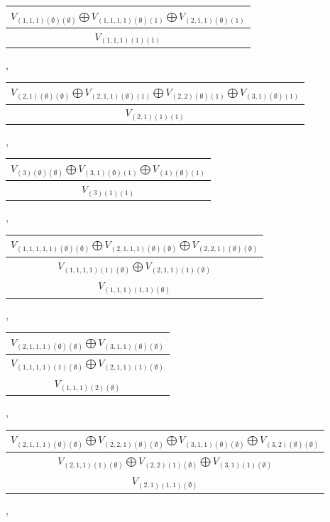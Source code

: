 \documentclass[letterpaper,11pt]{article}
\begin{document}
	\begin{tabular}{| c |}
		\hline
		$V_{(1,1,1)(\emptyset)(\emptyset)}$$\bigoplus$$V_{(1,1,1,1)(\emptyset)(1)}$$\bigoplus$$V_{(2,1,1)(\emptyset)(1)}$\\
		\hline
		$V_{(1,1,1)(1)(1)}$\\
		\hline
	\end{tabular}, 
	\newline 
	\begin{tabular}{| c |}
		\hline
		$V_{(2,1)(\emptyset)(\emptyset)}$$\bigoplus$$V_{(2,1,1)(\emptyset)(1)}$$\bigoplus$$V_{(2,2)(\emptyset)(1)}$$\bigoplus$$V_{(3,1)(\emptyset)(1)}$\\
		\hline
		$V_{(2,1)(1)(1)}$\\
		\hline
	\end{tabular},
	\begin{tabular}{| c |}
		\hline
		$V_{(3)(\emptyset)(\emptyset)}$$\bigoplus$$V_{(3,1)(\emptyset)(1)}$$\bigoplus$$V_{(4)(\emptyset)(1)}$\\
		\hline
		$V_{(3)(1)(1)}$\\
		\hline
	\end{tabular}, 
	\newline 
	\begin{tabular}{| c |}
		\hline
		$V_{(1,1,1,1,1)(\emptyset)(\emptyset)}$$\bigoplus$$V_{(2,1,1,1)(\emptyset)(\emptyset)}$$\bigoplus$$V_{(2,2,1)(\emptyset)(\emptyset)}$\\
		\hline
		$V_{(1,1,1,1)(1)(\emptyset)}$$\bigoplus$$V_{(2,1,1)(1)(\emptyset)}$\\
		\hline
		$V_{(1,1,1)(1,1)(\emptyset)}$\\
		\hline
	\end{tabular}, 
	\begin{tabular}{| c |}
		\hline
		$V_{(2,1,1,1)(\emptyset)(\emptyset)}$$\bigoplus$$V_{(3,1,1)(\emptyset)(\emptyset)}$\\
		\hline
		$V_{(1,1,1,1)(1)(\emptyset)}$$\bigoplus$$V_{(2,1,1)(1)(\emptyset)}$\\
		\hline
		$V_{(1,1,1)(2)(\emptyset)}$\\
		\hline
	\end{tabular}, 
	\newline 
	\begin{tabular}{| c |}
		\hline
		$V_{(2,1,1,1)(\emptyset)(\emptyset)}$$\bigoplus$$V_{(2,2,1)(\emptyset)(\emptyset)}$$\bigoplus$$V_{(3,1,1)(\emptyset)(\emptyset)}$$\bigoplus$$V_{(3,2)(\emptyset)(\emptyset)}$\\
		\hline
		$V_{(2,1,1)(1)(\emptyset)}$$\bigoplus$$V_{(2,2)(1)(\emptyset)}$$\bigoplus$$V_{(3,1)(1)(\emptyset)}$\\
		\hline
		$V_{(2,1)(1,1)(\emptyset)}$\\
		\hline
	\end{tabular}, 
\end{document}
